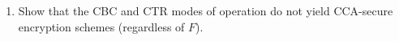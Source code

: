 \documentclass{article}
\begin{document}
\begin{enumerate}
\begin{enumerate}
\begin{proof}
            Since every message is CPA-secure, over multiple messages, the
            scheme is CPA-secure, which is a stronger guarantee than
            EAV-security.
          \end{proof}
    \end{enumerate}
  \item Show that the CBC and CTR modes of operation do not yield CCA-secure
    encryption schemes (regardless of $F$).

\end{enumerate}
\end{document}
